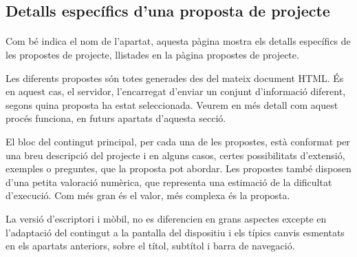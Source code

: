 \subsection{Detalls específics d'una proposta de projecte}

    \paragraph{}
    Com bé indica el nom de l'apartat, aquesta pàgina mostra els detalls específics de les propostes de projecte, llistades en la pàgina propostes de projecte.

    Les diferents propostes són totes generades des del mateix document HTML. És en aquest cas, el servidor, l'encarregat d'enviar un conjunt d'informació diferent, segons quina proposta ha estat seleccionada. Veurem en més detall com aquest procés funciona, en futurs apartats d’aquesta secció.

    El bloc del contingut principal, per cada una de les propostes, està conformat per una breu descripció del projecte i en alguns casos, certes possibilitats d'extensió, exem\-ples o preguntes, que la proposta pot abordar. Les propostes també disposen d’una petita valoració numèrica, que representa una estimació de la dificultat d’execució. Com més gran és el valor, més complexa és la proposta.

    La versió d'escriptori i mòbil, no es diferencien en grans aspectes excepte en l'adaptació del contingut a la pantalla del dispositiu i els típics canvis esmentats en els apartats anteriors, sobre el títol, subtítol i barra de navegació.
